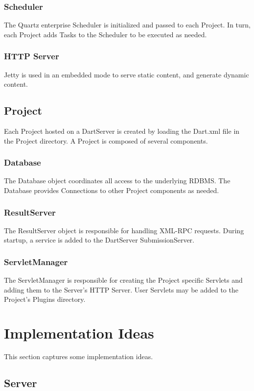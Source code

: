 \documentclass{InsightBook}
\begin{document}
\subsection{Scheduler}
The Quartz enterprise Scheduler is initialized and passed to each
Project.  In turn, each Project adds Tasks to the Scheduler to be
executed as needed.

\subsection{HTTP Server}
Jetty is used in an embedded mode to serve static content, and
generate dynamic content.

\section{Project}
Each Project hosted on a DartServer is created by loading the Dart.xml
file in the Project directory.  A Project is composed of several
components.

\subsection{Database}
The Database object coordinates all access to the underlying RDBMS.
The Database provides Connections to other Project components as
needed.

\subsection{ResultServer}
The ResultServer object is responsible for handling XML-RPC requests.
During startup, a service is added to the DartServer SubmissionServer.

\subsection{ServletManager}
The ServletManager is responsible for creating the Project specific
Servlets and adding them to the Server's HTTP Server.  User Servlets
may be added to the Project's Plugins directory.

\chapter{Implementation Ideas}
This section captures some implementation ideas.
\section{Server}
\end{document}
